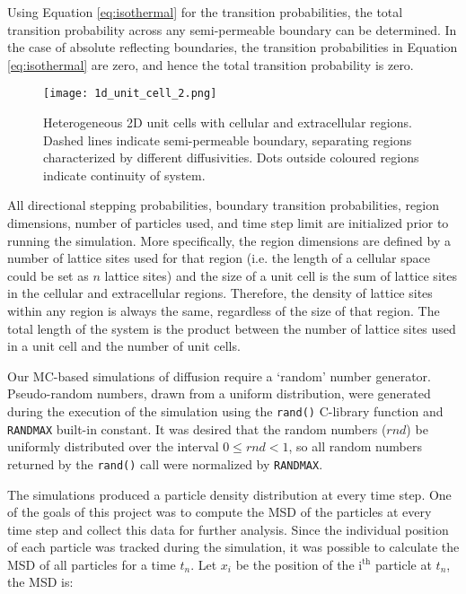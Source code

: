 	Using Equation \ref{eq:isothermal} for the transition probabilities, the total transition probability across any semi-permeable boundary can be determined. In the case of absolute reflecting boundaries, the transition probabilities in Equation \ref{eq:isothermal} are zero, and hence the total transition probability is zero.
	
	\begin{figure}[h]
		\centering
		\texttt{[image: 1d\_unit\_cell\_2.png]}
		\caption{Heterogeneous 2D unit cells with cellular and extracellular regions. Dashed lines indicate semi-permeable boundary, separating regions characterized by different diffusivities. Dots outside coloured regions indicate continuity of system.}
		\label{fig:1d_unit_cell_2.png}
	\end{figure}
	
	\newpage
	All directional stepping probabilities, boundary transition probabilities, region dimensions, number of particles used, and time step limit are initialized prior to running the simulation. More specifically, the region dimensions are defined by a number of lattice sites used for that region (i.e. the length of a cellular space could be set as $ n $ lattice sites) and the size of a unit cell is the sum of lattice sites in the cellular and extracellular regions. Therefore, the density of lattice sites within any region is always the same, regardless of the size of that region. The total length of the system is the product between the number of lattice sites used in a unit cell and the number of unit cells.
	 	
	Our MC-based simulations of diffusion require a `random' number generator. Pseudo-random numbers, drawn from a uniform distribution, were generated during the execution of the simulation using the \texttt{rand()} C-library function and \texttt{RAND\textunderscore MAX} built-in constant. It was desired that the random numbers ($ rnd $) be uniformly distributed over the interval $ 0 \leq rnd < 1 $, so all random numbers returned by the \texttt{rand()} call were normalized by \texttt{RAND\textunderscore MAX}.
	
	The simulations produced a particle density distribution at every time step. One of the goals of this project was to compute the MSD of the particles at every time step and collect this data for further analysis. Since the individual position of each particle was tracked during the simulation, it was possible to calculate the MSD of all particles for a time $ t_n $. Let $ x_i $ be the position of the $ \textrm{i}^\textrm{th} $ particle at $ t_n $, the MSD is:
	
